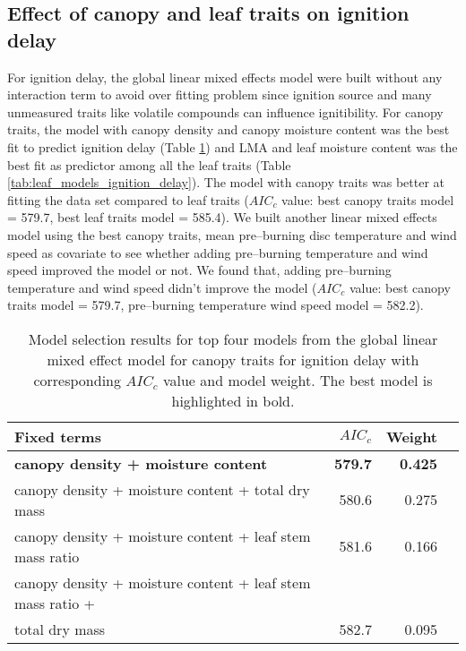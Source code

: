 \documentclass{bmcart}
\begin{document}
\subsection*{Effect of canopy and leaf traits on ignition delay}
For ignition delay, the global linear mixed effects model were built without any interaction term  to avoid over fitting problem since ignition source \citep{anderson1970forest, madrigal2012evaluation} and many unmeasured traits like volatile compounds can influence ignitibility. For canopy traits, the model with canopy density and canopy moisture content was the best fit to predict ignition delay (Table \ref{tab:canopy_models_ignition_delay}) and LMA and leaf moisture content was the best fit as predictor among all the leaf traits (Table \ref{tab:leaf_models_ignition_delay}). The model with canopy traits was better at fitting the data set compared to leaf traits ($AIC_{c}$ value: best canopy traits model = 579.7, best leaf traits model = 585.4). We built another linear mixed effects model using the best canopy traits,  mean pre--burning disc temperature and wind speed as  covariate to see whether adding pre--burning temperature and wind speed improved the model or not. We found that, adding pre--burning temperature and wind speed didn't improve the model ($AIC_{c}$ value: best canopy traits model = 579.7, pre--burning temperature wind speed model = 582.2).

\begin{table}
  \centering
  \caption{Model selection results for top four models from the global linear
    mixed effect model for canopy traits for ignition delay with corresponding
    $AIC_{c}$ value and model weight. The best model is highlighted in bold.}
  \begin{tabular}{lrrr}
    \toprule
    \textbf{Fixed terms} & $AIC_{c}$ & \textbf{Weight}\\
    \midrule
    \textbf{canopy density + moisture content}    & \textbf{579.7} & \textbf{0.425} \\
    canopy density + moisture content + total dry mass   & 580.6   & 0.275 \\
    canopy density + moisture content + leaf stem mass ratio       & 581.6   & 0.166  \\
    canopy density + moisture content + leaf stem mass ratio + \\
    total dry mass & 582.7  & 0.095 \\
    \bottomrule
  \end{tabular}
  \label{tab:canopy_models_ignition_delay}
\end{table}
\end{document}
